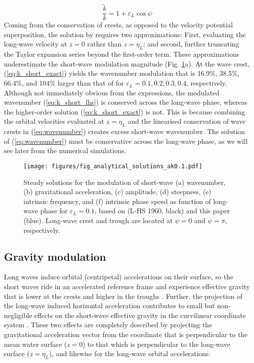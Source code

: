 \documentclass[lineno]{jfm}
\begin{document}
\begin{equation}
\label{eq:k_short_lhs}
\frac{\widetilde{k}}{k} = 1 + \varepsilon_L \cos{\psi}
\end{equation}
Coming from the conservation of crests, as opposed to the velocity potential
superposition, the solution by \citet{longuet1960changes} requires two
approximations:
First, evaluating the long-wave velocity at $z = 0$ rather than $z = \eta_L$; and
second, further truncating the Taylor expansion series beyond the first-order
term.
These approximations underestimate the short-wave modulation magnitude
(Fig. \ref{fig:analytical_solutions_ak0.1}a).
At the wave crest, (\ref{eq:k_short_exact}) yields the wavenumber modulation
that is 16.9\%, 38.5\%, 66.4\%, and 104\% larger than that of
\citet{longuet1960changes} for $\varepsilon_L = 0.1, 0.2, 0.3, 0.4$, respectively.
Although not immediately obvious from the expressions, the modulated wavenumber
(\ref{eq:k_short_lhs}) is conserved across the long-wave phase, whereas
the higher-order solution (\ref{eq:k_short_exact}) is not.
This is because combining the orbital velocities evaluated at $z=\eta_L$ and the
linearised conservation of wave crests in (\ref{eq:wavenumber}) creates excess
short-wave wavenumber.
The solution of (\ref{eq:wavenumber}) must be conservative across the long-wave
phase, as we will see later from the numerical simulations.

\begin{figure}
\centering
\texttt{[image: figures/fig\_analytical\_solutions\_ak0.1.pdf]}
\caption{
  Steady solutions for the modulation of short-wave (a) wavenumber, (b)
  gravitational acceleration, (c) amplitude, (d) steepness, (e) intrinsic
  frequency, and (f) intrinsic phase speed as function of long-wave phase for
  $\varepsilon_L = 0.1$, based on
  \citet{longuet1960changes} (L-HS 1960, black) and this paper (blue).
  Long-wave crest and trough are located at $\psi = 0$ and $\psi = \pi$,
  respectively.
}
\label{fig:analytical_solutions_ak0.1}
\end{figure}

\subsection{Gravity modulation}
\label{subsection:gravity_modulation}

Long waves induce orbital (centripetal) accelerations on their surface, so the
short waves ride in an accelerated reference frame and experience effective
gravity that is lower at the crests and higher in the troughs
\citep{longuet1986eulerian,longuet1987propagation}.
Further, the projection of the long-wave induced horizontal acceleration
contributes to small but non-negligible effects on the short-wave effective
gravity in the curvilinear coordinate system
\citep{phillips1981dispersion,zhang1990evolution}.
These two effects are completely described by projecting the gravitational
acceleration vector from the coordinate that is perpendicular to the mean water
surface ($z=0$) to that which is perpendicular to the long-wave surface
($z=\eta_L$), and likewise for the long-wave orbital accelerations:
\end{document}
